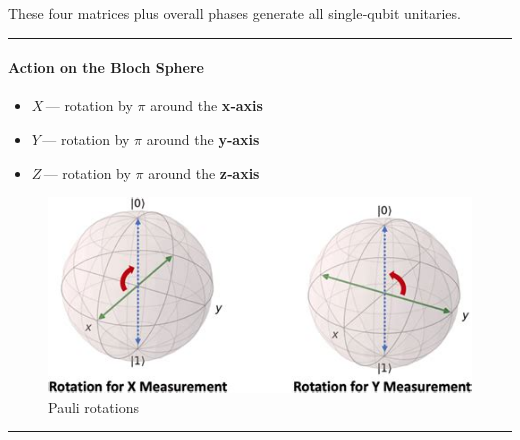 These four matrices plus overall phases generate all single‑qubit
unitaries.

\begin{center}\rule{0.5\linewidth}{0.5pt}\end{center}

\hypertarget{action-on-the-bloch-sphere}{%
\paragraph{Action on the Bloch
Sphere}\label{action-on-the-bloch-sphere}}

\begin{itemize}
\tightlist
\item
  \(X\)\,--- rotation by \(\pi\) around the \textbf{x‑axis}\\
\item
  \(Y\)\,--- rotation by \(\pi\) around the \textbf{y‑axis}\\
\item
  \(Z\)\,--- rotation by \(\pi\) around the \textbf{z‑axis}
\end{itemize}

\begin{figure}
\centering
\includegraphics{figures/pauli_axes.jpeg}
\caption{Pauli rotations}
\end{figure}

\begin{center}\rule{0.5\linewidth}{0.5pt}\end{center}

